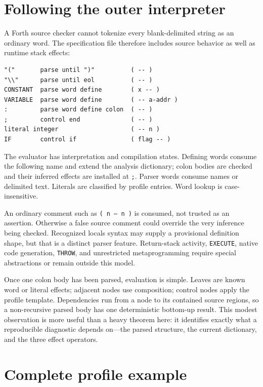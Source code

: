 \documentclass[10pt,a4paper]{article}
\begin{document}
\section{Following the outer interpreter}

A Forth source checker cannot tokenize every blank-delimited string as an
ordinary word.  The specification file therefore includes source behavior as
well as runtime stack effects:
\begin{lstlisting}
"("       parse until ")"          ( -- )
"\\"      parse until eol          ( -- )
CONSTANT  parse word define        ( x -- )
VARIABLE  parse word define        ( -- a-addr )
:         parse word define colon  ( -- )
;         control end              ( -- )
literal integer                    ( -- n )
IF        control if               ( flag -- )
\end{lstlisting}
The evaluator has interpretation and compilation states.  Defining words
consume the following name and extend the analysis dictionary; colon bodies
are checked and their inferred effects are installed at \texttt{;}.  Parser
words consume names or delimited text.  Literals are classified by profile
entries.  Word lookup is case-insensitive.

An ordinary comment such as \texttt{( n -- n )} is consumed, not trusted as an
assertion.  Otherwise a false source comment could override the very inference
being checked.  Recognized locals syntax may supply a provisional definition
shape, but that is a distinct parser feature.  Return-stack activity,
\texttt{EXECUTE}, native code generation, \texttt{THROW}, and unrestricted
metaprogramming require special abstractions or remain outside this model.

Once one colon body has been parsed, evaluation is simple.  Leaves are known
word or literal effects; adjacent nodes use composition; control nodes apply
the profile template.  Dependencies run from a node to its contained source
regions, so a non-recursive parsed body has one deterministic bottom-up result.
This modest observation is more useful than a heavy theorem here: it identifies
exactly what a reproducible diagnostic depends on---the parsed structure, the
current dictionary, and the three effect operators.

\section{Complete profile example}
\end{document}
